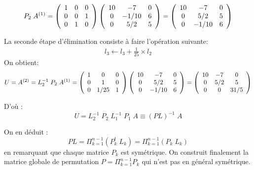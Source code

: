 \documentclass[a4paper, 10pt]{article}
\begin{document}
\begin{equation}
P_2\; A^{(1)}=
 \left(
\begin{array}{c c c}
1  & 0   &  0  \\
0  &  0   & 1  \\
0  &  1  &  0  
\end{array}
\right)
 \left(
\begin{array}{c c c}
10  & -7   &  0  \\
0  &  -1/10   & 6   \\
0  &  5/2  &  5  
\end{array}
\right)
=
 \left(
\begin{array}{c c c}
10  & -7   &  0  \\
0  &  5/2  &  5  \\
0  &  -1/10   & 6   
\end{array}
\right)
\end{equation}

La seconde étape d'élimination consiste à faire l'opération suivante: 
\begin{equation}
 \begin{array}{c}
  l_3 \leftarrow l_3 +\frac{1}{25} \times l_2 
\end{array}
\end{equation}
On obtient:
\begin{equation}
 U=A^{(2)}=L^{-1}_2 \;  P_2 \; A^{(1)}=
  \left(
\begin{array}{c c c}
1  & 0   &  0  \\
0  &  1   & 0  \\
0  &  1/25  &  1  
\end{array}
\right)
 \left(
\begin{array}{c c c}
10  & -7   &  0  \\
0  &  5/2  &  5  \\
0  &  -1/10   & 6   
\end{array}
\right)
=
 \left(
\begin{array}{c c c}
10  & -7   &  0  \\
0  &  5/2   & 5   \\
0  &  0  &  31/5  
\end{array}
\right)
\end{equation}

\noindent D'où : 
\begin{equation}
 U = L^{-1}_2 \;  P_2 \;  L^{-1}_1 \;  P_1 \;  A \equiv (PL)^{-1} \; A
 \end{equation}
 
\noindent On en déduit :
\begin{equation}
PL = \Pi_{k=1}^{n-1}  (P_k^t \; L_k) = \Pi_{k=1}^{n-1}  (P_k \; L_k)
\end{equation}
 en remarquant que chaque matrice $P_k$ est symétrique. On construit finalement la matrice globale de permutation $P= \Pi_{k=1}^{n-1}  P_k$
qui n'est pas en général symétrique.
\end{document}
